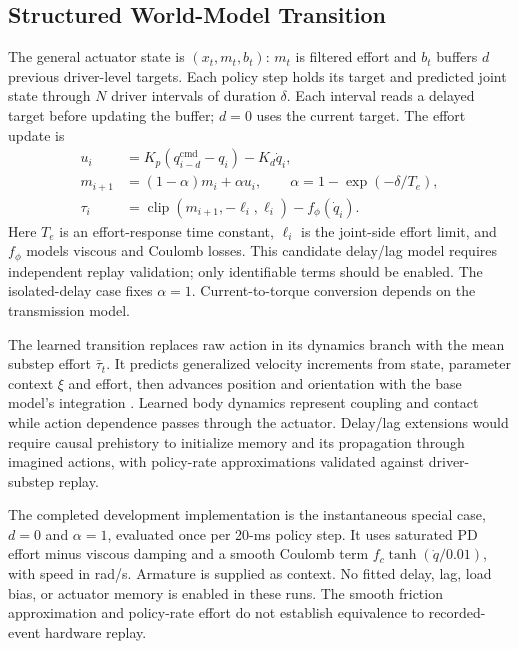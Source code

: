 \documentclass[letterpaper,10pt,conference]{ieeeconf}
\newcommand{\target}{q^{\mathrm{cmd}}}
\newcommand{\clip}{\operatorname{clip}}
\begin{document}
\subsection{Structured World-Model Transition}
The general actuator state is $(x_t,m_t,b_t)$: $m_t$ is filtered effort and $b_t$ buffers $d$ previous driver-level targets. Each policy step holds its target and predicted joint state through $N$ driver intervals of duration $\delta$. Each interval reads a delayed target before updating the buffer; $d=0$ uses the current target. The effort update is
\begin{subequations}\label{eq:actuator}
\begin{align}
 u_i &= K_p(\target_{i-d}-q_i)-K_d\dot q_i,\\
 m_{i+1} &= (1-\alpha)m_i+\alpha u_i,
 \qquad \alpha=1-\exp(-\delta/T_e),\\
 \tau_i &= \clip(m_{i+1},-\ell_i,\ell_i)-f_\phi(\dot q_i).
\end{align}
\end{subequations}
Here $T_e$ is an effort-response time constant, $\ell_i$ is the joint-side effort limit, and $f_\phi$ models viscous and Coulomb losses. This candidate delay/lag model requires independent replay validation; only identifiable terms should be enabled. The isolated-delay case fixes $\alpha=1$. Current-to-torque conversion depends on the transmission model.

The learned transition replaces raw action in its dynamics branch with the mean substep effort $\bar\tau_t$. It predicts generalized velocity increments from state, parameter context $\xi$ and effort, then advances position and orientation with the base model's integration \cite{supermimic}. Learned body dynamics represent coupling and contact while action dependence passes through the actuator. Delay/lag extensions would require causal prehistory to initialize memory and its propagation through imagined actions, with policy-rate approximations validated against driver-substep replay.

The completed development implementation is the instantaneous special case, $d=0$ and $\alpha=1$, evaluated once per 20-ms policy step. It uses saturated PD effort minus viscous damping and a smooth Coulomb term $f_c\tanh(\dot q/0.01)$, with speed in rad/s. Armature is supplied as context. No fitted delay, lag, load bias, or actuator memory is enabled in these runs. The smooth friction approximation and policy-rate effort do not establish equivalence to recorded-event hardware replay.
\end{document}
